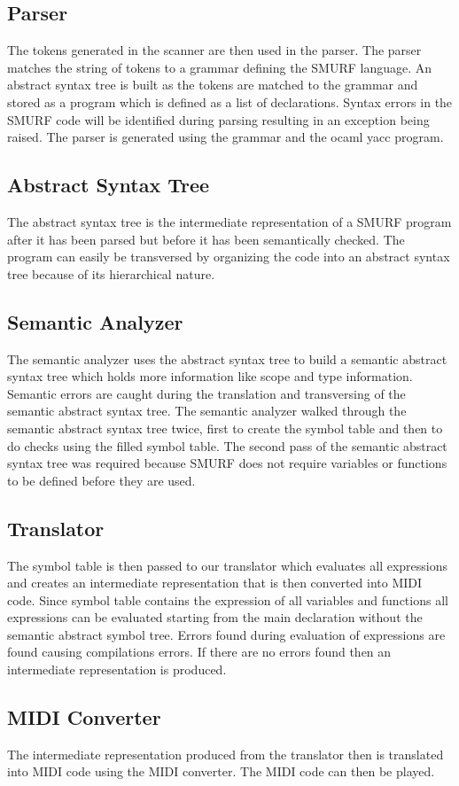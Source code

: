 \subsection{Parser}
The tokens generated in the scanner are then used in the parser. 
The parser matches the string of tokens to a grammar defining the 
SMURF language. An abstract syntax tree is built as the tokens 
are matched to the grammar and stored as a program which is 
defined as a list of declarations. Syntax errors in the 
SMURF code will be identified during parsing resulting 
in an exception being raised. The parser is generated using 
the grammar and the ocaml yacc program. 

\subsection{Abstract Syntax Tree}
The abstract syntax tree is the intermediate representation 
of a SMURF program after it has been parsed but before it has 
been semantically checked. The program can easily be transversed 
by organizing the code into an abstract syntax tree because of its 
hierarchical nature. 

\subsection{Semantic Analyzer}
The semantic analyzer uses the abstract syntax tree to build a 
semantic abstract syntax tree which holds more information like 
scope and type information. Semantic errors are caught during the 
translation and transversing of the semantic abstract syntax tree. 
The semantic analyzer walked through the semantic abstract syntax tree
twice, first to create the symbol table and then to do checks using 
the filled symbol table. The second pass of the semantic abstract 
syntax tree was required because SMURF does not require variables or 
functions to be defined before they are used.  

\subsection{Translator}
The symbol table is then passed to our translator 
which evaluates all expressions and creates an intermediate 
representation that is then converted into MIDI code. 
Since symbol table contains the expression of all 
variables and functions all expressions can be evaluated 
starting from the main declaration without the semantic 
abstract symbol tree. Errors found during evaluation 
of expressions are found causing compilations errors. 
If there are no errors found then an intermediate 
representation is produced. 

\subsection{MIDI Converter}
The intermediate representation produced from the translator then 
is translated into MIDI code using the MIDI converter. The MIDI 
code can then be played. 
